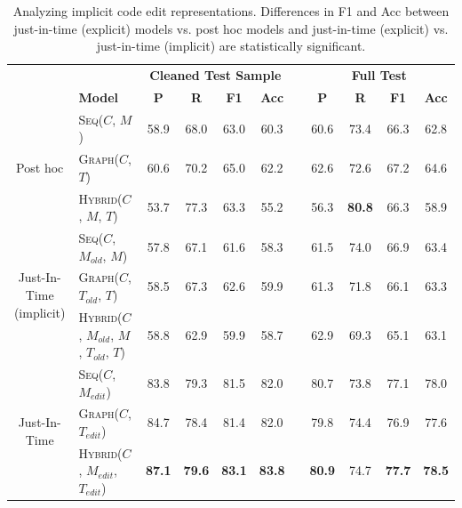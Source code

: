 \documentclass[letterpaper]{article} %
\newcommand{\Comment}{$C$}
\newcommand{\OldCode}{$M_{old}$}
\newcommand{\NewCode}{$M$}
\newcommand{\Posthoc}{post hoc}
\newcommand{\JustInTime}{just-in-time}
\newcommand{\EditCode}{$M_{edit}$}
\newcommand{\NewTree}{$T$}
\newcommand{\OldTree}{$T_{old}$}
\newcommand{\EditTree}{$T_{edit}$}
\newcommand{\SeqModel}{\textsc{Seq}}
\newcommand{\GraphModel}{\textsc{Graph}}
\newcommand{\HybridModel}{\textsc{Hybrid}}
\newcommand{\PosthocSeq}{\SeqModel{}(\Comment{}, \NewCode{})}
\newcommand{\PosthocGraph}{\GraphModel{}(\Comment{}, \NewTree{})}
\newcommand{\PosthocHybrid}{\HybridModel{}(\Comment{}, \NewCode{}, \NewTree{})}
\newcommand{\JustInTimeSeq}{\SeqModel{}(\Comment{}, \EditCode{})}
\newcommand{\JustInTimeGraph}{\GraphModel{}(\Comment{}, \EditTree{})}
\newcommand{\JustInTimeHybrid}{\HybridModel{}(\Comment{}, \EditCode{}, \EditTree{})}
\newcommand{\JustInTimeSeqImplicit}{\SeqModel{}(\Comment{}, \OldCode{}, \NewCode{})}
\newcommand{\JustInTimeGraphImplicit}{\GraphModel{}(\Comment{}, \OldTree{}, \NewTree{})}
\newcommand{\JustInTimeHybridImplicit}{\HybridModel{}(\Comment{}, \OldCode{}, \NewCode{}, \OldTree{}, \NewTree{})}
\begin{document}
\begin{table}[ht]
\centering
\small
\begin{tabular}{c@{\hskip 2mm}l@{\hskip 4mm}ccccccccc}
\hline
& & \multicolumn{4}{c}{\bf Cleaned Test Sample} & & \multicolumn{4}{c}{\bf Full Test} \\
\cline{3-6}
\cline{8-11}
& \bf Model & \bf P & \bf R & \bf F1 & \bf Acc & & \bf P & \bf R & \bf F1 & \bf Acc\\
\hline
\multirow{3}{*}{Post hoc}
& \PosthocSeq{}  & 58.9 & 68.0 & 63.0 & 60.3 & & 60.6 & 73.4 & 66.3 & 62.8\\
& \PosthocGraph{}{}  & 60.6 & 70.2 & 65.0 & 62.2 & & 62.6 & 72.6 & 67.2 & 64.6 \\
& \PosthocHybrid{}{}  & 53.7 & 77.3 & 63.3 & 55.2 & & 56.3 & \bf 80.8 & 66.3 & 58.9 \\
\hline
\multirow{3}{*}{Just-In-Time (implicit)} 
& \JustInTimeSeqImplicit{}   & 57.8 & 67.1 & 61.6 & 58.3 & & 61.5 & 74.0 & 66.9 & 63.4 \\
& \JustInTimeGraphImplicit{}  & 58.5 & 67.3 & 62.6 & 59.9 & & 61.3 & 71.8 & 66.1 & 63.3 \\
& \JustInTimeHybridImplicit{}  & 58.8 & 62.9 & 59.9 & 58.7 & & 62.9 & 69.3 & 65.1 & 63.1 \\

\hline
\multirow{3}{*}{Just-In-Time} 
& \JustInTimeSeq{}  & 83.8 & 79.3 & 81.5 & 82.0& & 80.7 & 73.8 & 77.1 & 78.0 \\
& \JustInTimeGraph{}  & 84.7 & 78.4 & 81.4 & 82.0 & & 79.8 & 74.4 & 76.9 & 77.6 \\
& \JustInTimeHybrid{}  & \bf 87.1 & \bf 79.6 & \bf 83.1 & \bf 83.8 & & \bf 80.9 & 74.7 & \bf 77.7& \bf 78.5 \\




\hline
\end{tabular}
\vspace{-5pt}
\caption{\label{table:implicit-explicit-table}Analyzing implicit code edit representations. Differences in F1 and Acc between \JustInTime{} (explicit) models vs. \Posthoc{} models and \JustInTime{} (explicit) vs. \JustInTime{} (implicit) are statistically significant.}
\end{table}




 
  
\end{document}
